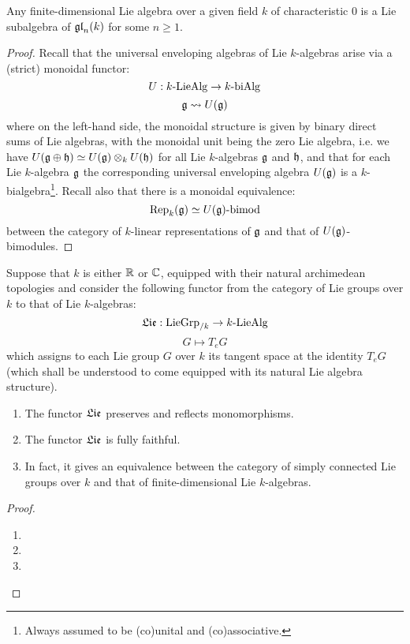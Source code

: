         \begin{lemma} \label{lemma: embedding_finite_dimensional_lie_algebras_into_matrix_algebras}
            Any finite-dimensional Lie algebra over a given field $k$ of characteristic $0$ is a Lie subalgebra of $\mathfrak{gl}_n(k)$ for some $n \geq 1$.
        \end{lemma}
            \begin{proof}
                Recall that the universal enveloping algebras of Lie $k$-algebras arise via a (strict) monoidal functor:
                    $$U: k\text{-}\mathrm{Lie}\mathrm{Alg} \to k\text{-}\mathrm{bi}\mathrm{Alg}$$
                    $$\mathfrak{g} \leadsto U(\mathfrak{g})$$
                where on the left-hand side, the monoidal structure is given by binary direct sums of Lie algebras, with the monoidal unit being the zero Lie algebra, i.e. we have $U(\g \oplus \h) \cong U(\g) \tensor_k U(\h)$ for all Lie $k$-algebras $\mathfrak{g}$ and $\mathfrak{h}$, and that for each Lie $k$-algebra $\mathfrak{g}$ the corresponding universal enveloping algebra $U(\mathfrak{g})$ is a $k$-bialgebra\footnote{Always assumed to be (co)unital and (co)associative.}. Recall also that there is a monoidal equivalence:
                    $$\mathrm{Rep}_k(\mathfrak{g}) \simeq U(\mathfrak{g})\text{-}\mathrm{bimod}$$
                between the category of $k$-linear representations of $\mathfrak{g}$ and that of $U(\mathfrak{g})$-bimodules.
            \end{proof}
        
        \begin{theorem} \label{theorem: fundamental_theorem_of_lie_theory}
            Suppose that $k$ is either $\mathbb{R}$ or $\mathbb{C}$, equipped with their natural archimedean topologies and consider the following functor from the category of Lie groups over $k$ to that of Lie $k$-algebras:
                $$\mathfrak{Lie}: \mathrm{Lie}\mathrm{Grp}_{/k} \to k\text{-}\mathrm{Lie}\mathrm{Alg}$$
                $$G \mapsto T_e G$$
            which assigns to each Lie group $G$ over $k$ its tangent space at the identity $T_eG$ (which shall be understood to come equipped with its natural Lie algebra structure). 
                \begin{enumerate}
                    \item The functor $\mathfrak{Lie}$ preserves and reflects monomorphisms.
                    \item The functor $\mathfrak{Lie}$ is fully faithful. 
                    \item In fact, it gives an equivalence between the category of simply connected Lie groups over $k$ and that of finite-dimensional Lie $k$-algebras.
                \end{enumerate}
        \end{theorem}
            \begin{proof}
                \noindent
                \begin{enumerate}
                    \item 
                    \item 
                    \item 
                \end{enumerate}
            \end{proof}
        
